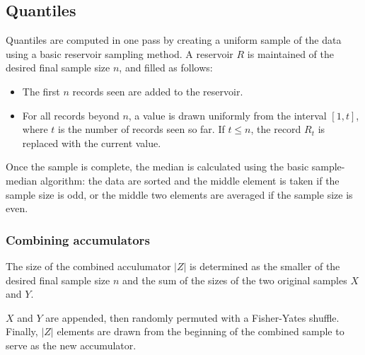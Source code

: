 \documentclass[a4paper]{article}
\begin{document}
\subsection{Quantiles}\label{quantiles}

Quantiles are computed in one pass by creating a uniform sample of the
data using a basic reservoir
sampling\cite{vitter1985}\cite[pp.~144-145]{Knuth1997} method. A
reservoir \(R\) is maintained of the desired final sample size \(n\),
and filled as follows:

\begin{itemize}
\item
The first \(n\) records seen are added to the reservoir.

\item
For all records beyond \(n\), a value is drawn uniformly from the
interval \([1, t]\), where \(t\) is the number of records seen so
far. If \(t \leq n\), the record \(R_t\) is replaced with the current value.
\end{itemize}

Once the sample is complete, the median is calculated using the basic
sample-median algorithm: the data are sorted and the middle element is
taken if the sample size is odd, or the middle two elements are
averaged if the sample size is even.

\subsubsection{Combining accumulators}

The size of the combined acculumator \(|Z|\) is determined as
the smaller of the desired final sample size \(n\) and the sum of the
sizes of the two original samples \(X\) and \(Y\).

\(X\) and \(Y\) are appended, then randomly permuted with a
Fisher-Yates shuffle\cite[pp.~145-146]{Knuth1997}. Finally, \(|Z|\) elements are drawn from the
beginning of the combined sample to serve as the new accumulator.



\end{document}
